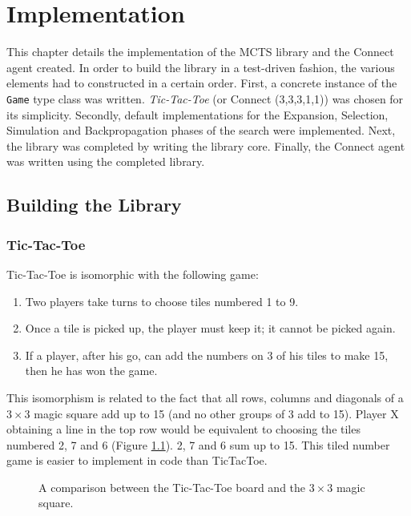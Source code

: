 \chapter{Implementation}
This chapter details the implementation of the {MCTS} library and the {Connect} agent created.
In order to build the library in a test-driven fashion, the various elements had to constructed in a certain order. First, a concrete instance of the \texttt{Game} type class was written. \textit{Tic-Tac-Toe} (or {Connect} (3,3,3,1,1)) was chosen for its simplicity. Secondly, default implementations for the {Expansion}, {Selection}, {Simulation} and {Backpropagation} phases of the search were implemented. Next, the library was completed by writing the library core. Finally, the {Connect} agent was written using the completed library.
\section{Building the Library}
\subsection{{Tic-Tac-Toe}\label{sec:ttt}\label{sec:arbitrary}}
{Tic-Tac-Toe} is isomorphic with the following game:
\begin{enumerate}
\item Two players take turns to choose tiles numbered 1 to 9.
\item Once a tile is picked up, the player must keep it; it cannot be picked again.
\item If a player, after his go, can add the numbers on 3 of his tiles to make 15, then he has won the game.
\end{enumerate}

This isomorphism is related to the fact that all rows, columns and diagonals of a $3 \times 3$ magic square add up to 15 (and no other groups of 3 add to 15).  Player X obtaining a line in the top row would be equivalent to choosing the tiles numbered 2, 7 and 6 (Figure \ref{fig:tttms}). 2, 7 and 6 sum up to 15. This tiled number game is easier to implement in code than {TicTacToe}. 

\begin{figure}
\centering
%
\caption{A comparison between the {Tic-Tac-Toe} board and the $3 \times 3$ magic square.}
\label{fig:tttms}
\end{figure}

